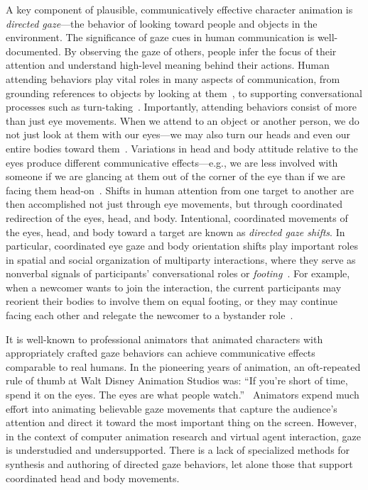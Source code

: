 A key component of plausible, communicatively effective character animation is \emph{directed gaze}---the behavior of looking toward people and objects in the environment.
The significance of gaze cues in human communication is well-documented. By observing the gaze of others, people infer the focus of their attention and understand high-level meaning behind their actions. Human attending behaviors play vital roles in many aspects of communication, from grounding references to objects by looking at them~\citep{hanna2007speakers,preissler2005role}, to supporting conversational processes such as turn-taking~\citep{wiemann1975turn}.
Importantly, attending behaviors consist of more than just eye movements. When we attend to an object or another person, we do not just look at them with our eyes---we may also turn our heads and even our entire bodies toward them~\citep{langton2000eyes}. Variations in head and body attitude relative to the eyes produce different communicative effects---e.g., we are less involved with someone if we are glancing at them out of the corner of the eye than if we are facing them head-on~\citep{kendon1990conducting,schegloff1998bodytorque}.
Shifts in human attention from one target to another are then accomplished not just through eye movements, but through coordinated redirection of the eyes, head, and body. Intentional, coordinated movements of the eyes, head, and body toward a target are known as \emph{directed gaze shifts}.
In particular, coordinated eye gaze and body orientation shifts play important roles in spatial and social organization of multiparty interactions, where they serve as nonverbal signals of participants' conversational roles or \emph{footing}~\citep{goffman1979footing}. For example, when a newcomer wants to join the interaction, the current participants may reorient their bodies to involve them on equal footing, or they may continue facing each other and relegate the newcomer to a bystander role~\citep{kendon1990conducting}.

It is well-known to professional animators that animated characters with appropriately crafted gaze behaviors can achieve communicative effects comparable to real humans. In the pioneering years of animation, an oft-repeated rule of thumb at Walt Disney Animation Studios was: ``If you're short of time, spend it on the eyes. The eyes are what people watch.''~\citep{williams2009animator} Animators expend much effort into animating believable gaze movements that capture the audience's attention and direct it toward the most important thing on the screen.
However, in the context of computer animation research and virtual agent interaction, gaze is understudied and undersupported. There is a lack of specialized methods for synthesis and authoring of directed gaze behaviors, let alone those that support coordinated head and body movements.


